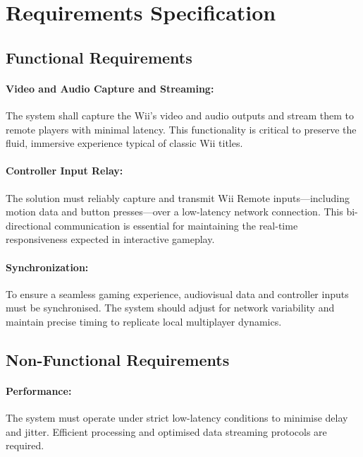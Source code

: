 \chapter{Requirements Specification}
\label{chapter:requirements}

\section{Functional Requirements}

\subsubsection{Video and Audio Capture and Streaming:}
	      The system shall capture the Wii’s video and audio outputs and stream them to remote players with minimal latency. This functionality is critical to preserve the fluid, immersive experience typical of classic Wii titles.

\subsubsection{Controller Input Relay:}
	      The solution must reliably capture and transmit Wii Remote inputs—including motion data and button presses—over a low-latency network connection. This bi-directional communication is essential for maintaining the real-time responsiveness expected in interactive gameplay.

\subsubsection{Synchronization:}
	      To ensure a seamless gaming experience, audiovisual data and controller inputs must be synchronised. The system should adjust for network variability and maintain precise timing to replicate local multiplayer dynamics.




\section{Non-Functional Requirements}

\subsubsection{Performance:}
	      The system must operate under strict low-latency conditions to minimise delay and jitter. Efficient processing and optimised data streaming protocols are required.

